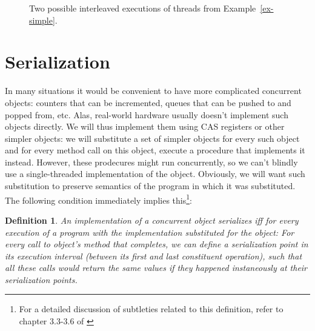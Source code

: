 \documentclass{thesis}
\newcommand{\atomic}[4]{\node(lab#1) at (#3,-#4+0.5) {#2};\draw (#3,-#4-0.1) to (lab#1);\node[inner sep=0pt](#1) at (#3,-#4) {};}
\newtheorem{definition}{Definition}
\newcommand{\fn}[1]{\textsc{#1}}
\begin{document}
\begin{figure}[!h]

\caption{Two possible interleaved executions of threads from Example~\ref{ex-simple}.}
\label{fig-ex-simple}
\end{figure}

\section{Serialization}
In many situations it would be convenient to have more complicated concurrent objects: counters that can be incremented,
queues that can be pushed to and popped from, etc. Alas, real-world hardware usually doesn't implement such objects
directly. We will thus implement them using CAS registers or other simpler objects: we will substitute a set of simpler objects for every such object and for every method call on this object, execute a procedure that implements it instead.
However, these prodecures might run concurrently, so we can't blindly use a single-threaded implementation of the object.
Obviously, we will want such substitution to preserve semantics of the program in which it was substituted. The following condition immediately implies
this\footnote{For a detailed discussion of subtleties related to this definition, refer to chapter 3.3-3.6 of \cite{TheArt}}:

\begin{definition}
An implementation of a concurrent object \emph{serializes} iff for every execution of a program with the implementation
substituted for the object:
For every call to object's method that completes, we can define a \emph{serialization point} in its execution
interval (between its first and last constituent operation), such that all these calls would return the same values if they happened instaneously at their serialization
points.
\end{definition}
\end{document}
